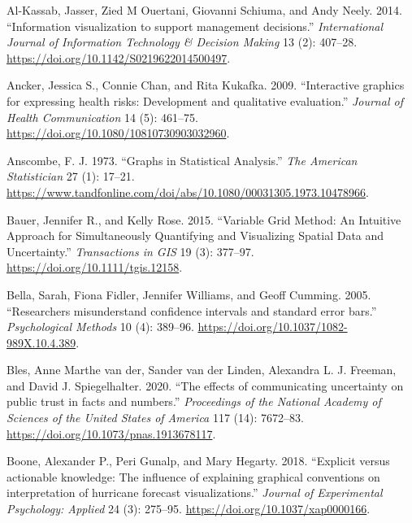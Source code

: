 \documentclass[
  letterpaper,
  DIV=11,
  numbers=noendperiod]{scrartcl}
\newlength{\cslhangindent}
\newlength{\cslentryspacingunit} %
\newenvironment{CSLReferences}[2] %
 {%
  \setlength{\parindent}{0pt}
  \ifodd #1
  \let\oldpar\par
  \def\par{\hangindent=\cslhangindent\oldpar}
  \fi
  \setlength{\parskip}{#2\cslentryspacingunit}
 }%
 {}
\begin{document}
\hypertarget{refs}{}
\begin{CSLReferences}{1}{0}
\leavevmode{}%
Al-Kassab, Jasser, Zied M Ouertani, Giovanni Schiuma, and Andy Neely.
2014. {``{Information visualization to support management decisions}.''}
\emph{International Journal of Information Technology \& Decision
Making} 13 (2): 407--28.
\url{https://doi.org/10.1142/S0219622014500497}.

\leavevmode{}%
Ancker, Jessica S., Connie Chan, and Rita Kukafka. 2009. {``{Interactive
graphics for expressing health risks: Development and qualitative
evaluation}.''} \emph{Journal of Health Communication} 14 (5): 461--75.
\url{https://doi.org/10.1080/10810730903032960}.

\leavevmode{}%
Anscombe, F. J. 1973. {``Graphs in Statistical Analysis.''} \emph{The
American Statistician} 27 (1): 17--21.
\url{https://www.tandfonline.com/doi/abs/10.1080/00031305.1973.10478966}.

\leavevmode{}%
Bauer, Jennifer R., and Kelly Rose. 2015. {``{Variable Grid Method: An
Intuitive Approach for Simultaneously Quantifying and Visualizing
Spatial Data and Uncertainty}.''} \emph{Transactions in GIS} 19 (3):
377--97. \url{https://doi.org/10.1111/tgis.12158}.

\leavevmode{}%
Bella, Sarah, Fiona Fidler, Jennifer Williams, and Geoff Cumming. 2005.
{``{Researchers misunderstand confidence intervals and standard error
bars}.''} \emph{Psychological Methods} 10 (4): 389--96.
\url{https://doi.org/10.1037/1082-989X.10.4.389}.

\leavevmode{}%
Bles, Anne Marthe van der, Sander van der Linden, Alexandra L. J.
Freeman, and David J. Spiegelhalter. 2020. {``{The effects of
communicating uncertainty on public trust in facts and numbers}.''}
\emph{Proceedings of the National Academy of Sciences of the United
States of America} 117 (14): 7672--83.
\url{https://doi.org/10.1073/pnas.1913678117}.

\leavevmode{}%
Boone, Alexander P., Peri Gunalp, and Mary Hegarty. 2018. {``{Explicit
versus actionable knowledge: The influence of explaining graphical
conventions on interpretation of hurricane forecast visualizations}.''}
\emph{Journal of Experimental Psychology: Applied} 24 (3): 275--95.
\url{https://doi.org/10.1037/xap0000166}.


\end{CSLReferences}
\end{document}
